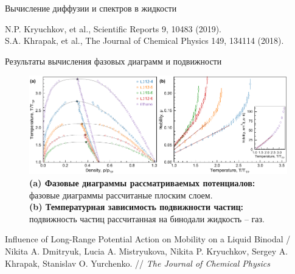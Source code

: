 \documentclass{beamer}
\begin{document}
\begin{frame}{Вычисление диффузии и спектров в жидкости}
{}

\vspace{1.0cm}
\tiny{N.P. Kryuchkov, et al., Scientific Reports 9, 10483 (2019). \\
S.A. Khrapak, et al., The Journal of Chemical Physics 149, 134114 (2018).}

\end{frame}












\begin{frame}{Результаты вычисления фазовых диаграмм и подвижности}
\footnotesize{
\begin{figure}
    \centering
    \includegraphics[width=\textwidth]{MACR-Figure3}
    \caption{\footnotesize{\textbf{(a) Фазовые диаграммы рассматриваемых потенциалов:} фазовые диаграммы рассчитаные плоским слоем.\\
 \textbf{(b) Температурная зависимость подвижности частиц:} подвижность частиц рассчитанная на бинодали жидкость -- газ.}}
\end{figure}

}

\tiny{Influence of Long-Range Potential Action on Mobility on a Liquid Binodal / Nikita A. Dmitryuk, Lucia A. Mistryukova, Nikita P. Kryuchkov, Sergey A. Khrapak, Stanislav O. Yurchenko. // \textit{The Journal of Chemical Physics}}

\end{frame}
\end{document}
